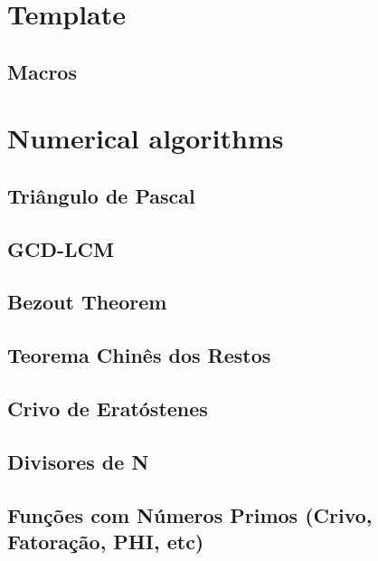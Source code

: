 \section{Template}
\subsection{Macros}
\raggedbottom
\hrulefill

\section{Numerical algorithms}
\subsection{Triângulo de Pascal}
\raggedbottom
\hrulefill
\subsection{GCD-LCM}
\raggedbottom
\hrulefill
\subsection{Bezout Theorem}
\raggedbottom
\hrulefill
\subsection{Teorema Chinês dos Restos}
\raggedbottom
\hrulefill
\subsection{Crivo de Eratóstenes}
\raggedbottom
\hrulefill
\subsection{Divisores de N}
\raggedbottom
\hrulefill
\subsection{Funções com Números Primos (Crivo, Fatoração, PHI, etc)}
\raggedbottom
\hrulefill
